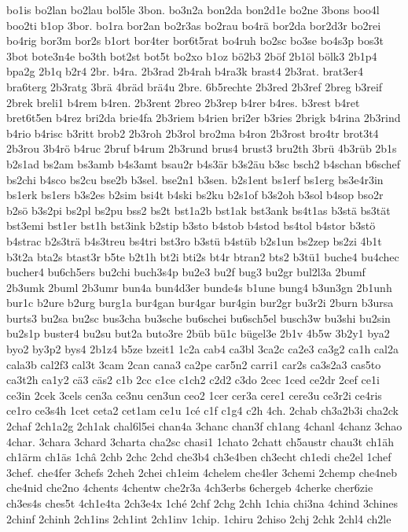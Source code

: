 {bo1is
bo2lan
bo2lau
bol5le
3bon.
bo3n2a
bon2da
bon2d1e
bo2ne
3bons
boo4l
boo2ti
b1op
3bor.
bo1ra
bor2an
bo2r3as
bo2rau
bo4rä
bor2da
bor2d3r
bo2rei
bo4rig
bor3m
bor2s
b1ort
bor4ter
bor6t5rat
bo4ruh
bo2sc
bo3se
bo4s3p
bos3t
3bot
bote3n4e
bo3th
bot2st
bot5t
bo2xo
b1oz
bö2b3
2böf
2b1öl
bölk3
2b1p4
bpa2g
2b1q
b2r4
2br.
b4ra.
2b3rad
2b4rah
b4ra3k
brast4
2b3rat.
brat3er4
bra6terg
2b3ratg
3brä
4bräd
brä4u
2bre.
6b5rechte
2b3red
2b3ref
2breg
b3reif
2brek
breli1
b4rem
b4ren.
2b3rent
2breo
2b3rep
b4rer
b4res.
b3rest
b4ret
bret6t5en
b4rez
bri2da
brie4fa
2b3riem
b4rien
bri2er
b3ries
2brigk
b4rina
2b3rind
b4rio
b4risc
b3ritt
brob2
2b3roh
2b3rol
bro2ma
b4ron
2b3rost
bro4tr
brot3t4
2b3rou
3b4rö
b4ruc
2bruf
b4rum
2b3rund
brus4
brust3
bru2th
3brü
4b3rüb
2b1s
b2s1ad
bs2am
bs3amb
b4s3amt
bsau2r
b4s3är
b3s2äu
b3sc
bsch2
b4schan
b6schef
bs2chi
b4sco
bs2cu
bse2b
b3sel.
bse2n1
b3sen.
b2s1ent
bs1erf
bs1erg
bs3e4r3in
bs1erk
bs1ers
b3s2es
b2sim
bsi4t
b4ski
bs2ku
b2s1of
b3s2oh
b3sol
b4sop
bso2r
b2sö
b3s2pi
bs2pl
bs2pu
bss2
bs2t
bst1a2b
bst1ak
bst3ank
bs4t1as
b3stä
bs3tät
bst3emi
bst1er
bst1h
bst3ink
b2stip
b3sto
b4stob
b4stod
bs4tol
b4stor
b3stö
b4strac
b2s3trä
b4s3treu
bs4tri
bst3ro
b3stü
b4stüb
b2s1un
bs2zep
bs2zi
4b1t
b3t2a
bta2s
btast3r
b5te
b2t1h
bt2i
bti2s
bt4r
btran2
bts2
b3tü1
buche4
bu4chec
bucher4
bu6ch5ers
bu2chi
buch3s4p
bu2e3
bu2f
bug3
bu2gr
bul2l3a
2bumf
2b3umk
2buml
2b3umr
bun4a
bun4d3er
bunde4s
b1une
bung4
b3un3gn
2b1unh
bur1c
b2ure
b2urg
burg1a
bur4gan
bur4gar
bur4gin
bur2gr
bu3r2i
2burn
b3ursa
burts3
bu2sa
bu2sc
bus3cha
bu3sche
bu6schei
bu6sch5el
busch3w
bu3shi
bu2sin
bu2s1p
buster4
bu2su
but2a
buto3re
2büb
bü1c
bügel3e
2b1v
4b5w
3b2y1
bya2
byo2
by3p2
bys4
2b1z4
b5ze
bzeit1
1c2a
cab4
ca3bl
3ca2c
ca2e3
ca3g2
ca1h
cal2a
cala3b
cal2f3
cal3t
3cam
2can
cana3
ca2pe
car5n2
carri1
car2s
ca3s2a3
cas5to
ca3t2h
ca1y2
cä3
cäs2
c1b
2cc
c1ce
c1ch2
c2d2
c3do
2cec
1ced
ce2dr
2cef
ce1i
ce3in
2cek
3cels
cen3a
ce3nu
cen3un
ceo2
1cer
cer3a
cere1
cere3u
ce3r2i
ce4ris
ce1ro
ce3s4h
1cet
ceta2
cet1am
ce1u
1cé
c1f
c1g4
c2h
4ch.
2chab
ch3a2b3i
cha2ck
2chaf
2ch1a2g
2ch1ak
chal6l5ei
chan4a
3chanc
chan3f
ch1ang
4chanl
4chanz
3chao
4char.
3chara
3chard
3charta
cha2sc
chasi1
1chato
2chatt
ch5austr
chau3t
ch1äh
ch1ärm
ch1äs
1châ
2chb
2chc
2chd
che3b4
ch3e4ben
ch3echt
ch1edi
che2el
1chef
3chef.
che4fer
3chefs
2cheh
2chei
ch1eim
4chelem
che4ler
3chemi
2chemp
che4neb
che4nid
che2no
4chents
4chentw
che2r3a
4ch3erbs
6chergeb
4cherke
cher6zie
ch3es4s
ches5t
4ch1e4ta
2ch3e4x
1ché
2chf
2chg
2chh
1chia
chi3na
4chind
3chines
2chinf
2chinh
2ch1ins
2ch1int
2ch1inv
1chip.
1chiru
2chiso
2chj
2chk
2chl4
ch2le
}
